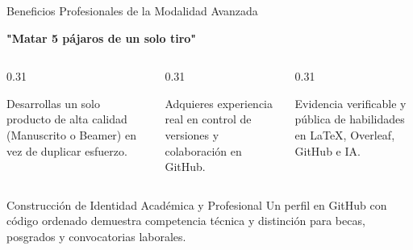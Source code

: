 \documentclass[aspectratio=169, 10pt]{beamer}
\begin{document}
\begin{frame}{Beneficios Profesionales de la Modalidad Avanzada}
  \begin{center}
    \textbf{\large "Matar 5 pájaros de un solo tiro"}
  \end{center}
  \vspace{0.05cm}

  \begin{columns}[T]
    \begin{column}{0.31\textwidth}
      \begin{tcolorbox}[colback=pucpLightBlue!50,colframe=pucpBlue,title=\textbf{1. Menor Carga},fonttitle=\bfseries\scriptsize,halign=center,boxrule=0.5pt,top=1.5mm,bottom=1.5mm]
        \scriptsize
        Desarrollas un solo producto de alta calidad (Manuscrito o Beamer) en vez de duplicar esfuerzo.
      \end{tcolorbox}
    \end{column}

    \begin{column}{0.31\textwidth}
      \begin{tcolorbox}[colback=pucpLightBlue!50,colframe=pucpBlue,title=\textbf{2. Dominio de Git},fonttitle=\bfseries\scriptsize,halign=center,boxrule=0.5pt,top=1.5mm,bottom=1.5mm]
        \scriptsize
        Adquieres experiencia real en control de versiones y colaboración en GitHub.
      \end{tcolorbox}
    \end{column}

    \begin{column}{0.31\textwidth}
      \begin{tcolorbox}[colback=pucpLightBlue!50,colframe=pucpRed,title=\textbf{3. Portafolio LinkedIn},fonttitle=\bfseries\scriptsize,halign=center,boxrule=0.5pt,top=1.5mm,bottom=1.5mm]
        \scriptsize
        Evidencia verificable y pública de habilidades en \LaTeX, Overleaf, GitHub e IA.
      \end{tcolorbox}
    \end{column}
  \end{columns}

  \vspace{0.15cm}
  \begin{alertblock}{Construcción de Identidad Académica y Profesional}
    \small
    Un perfil en GitHub con código ordenado demuestra competencia técnica y distinción para becas, posgrados y convocatorias laborales.
  \end{alertblock}
\end{frame}
\end{document}
